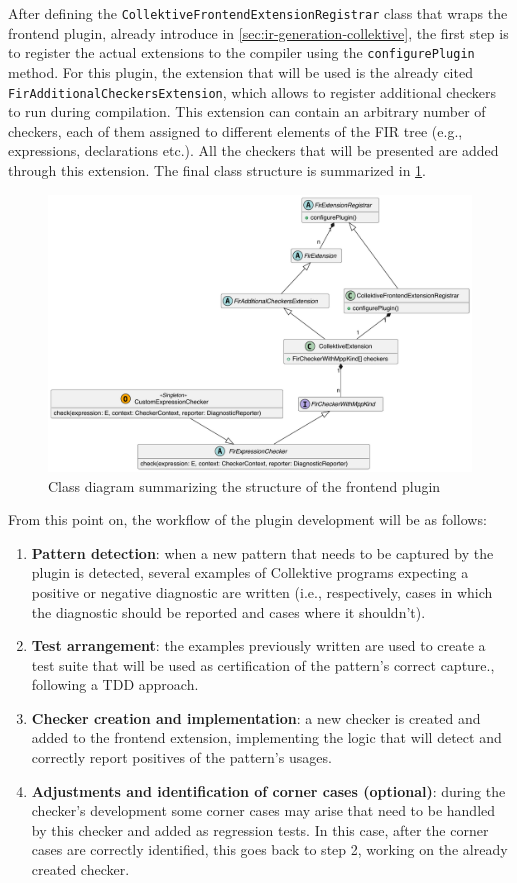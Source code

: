 \documentclass[12pt,a4paper,openright,twoside]{book}
\begin{document}
After defining the \lstinline{CollektiveFrontendExtensionRegistrar} class that
wraps the frontend plugin, already introduce in \cref{sec:ir-generation-collektive}, the
first step is to register the actual extensions to the compiler using the
\lstinline{configurePlugin} method. For this plugin, the extension that will
be used is the already cited \lstinline{FirAdditionalCheckersExtension}, which
allows to register additional checkers to run during compilation.
%
This extension can contain an arbitrary number of checkers, each of them
assigned to different elements of the \ac{FIR} tree (e.g., expressions,
declarations etc.). All the checkers that will be presented are added 
through this extension. The final class structure is summarized in
\cref{fig:frontend-class-diagram}.

\begin{figure}
  \centering
  \includegraphics[width=.8\linewidth]{figures/frontend-class-diagram.pdf}
  \caption{Class diagram summarizing the structure of the frontend plugin}
  \label{fig:frontend-class-diagram}
\end{figure}

From this point on, the workflow of the plugin development will be as follows:

\begin{enumerate}
  \item \textbf{Pattern detection}: when a new pattern that needs to be captured
  by the plugin is detected, several examples of Collektive programs expecting a
  positive or negative  diagnostic are written (i.e., respectively, cases in
  which the diagnostic should be reported and cases where it shouldn't).
  \item \textbf{Test arrangement}: the examples previously written are used to 
  create a test suite that will be used as certification of the pattern's correct
  capture., following a \ac{TDD} approach.
  \item \textbf{Checker creation and implementation}: a new checker is created and
  added to the frontend extension, implementing the logic that will detect and 
  correctly report positives of the pattern's usages.
  \item \textbf{Adjustments and identification of corner cases (optional)}: during
  the checker's development some corner cases may arise that need to be handled 
  by this checker and added as regression tests. In this case, after the corner 
  cases are correctly identified, this goes back to step 2, working on the already
  created checker.
\end{enumerate}
\end{document}
